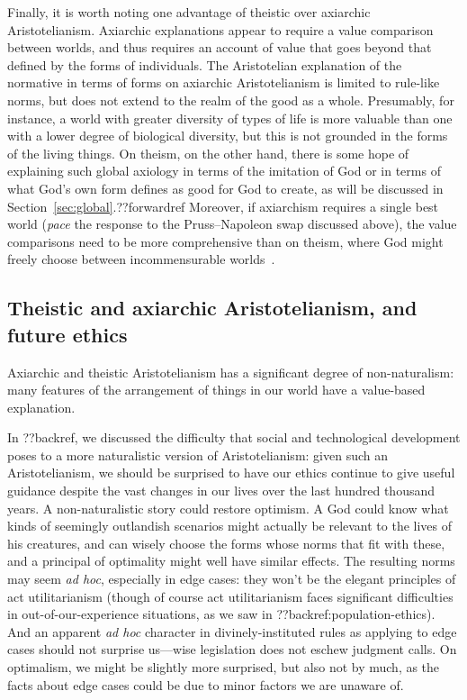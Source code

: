 Finally, it is worth noting one advantage of theistic over axiarchic Aristotelianism. Axiarchic explanations 
appear to require a value comparison between worlds, and thus requires an account of value that goes beyond 
that defined by the forms of individuals. The Aristotelian explanation of the normative in terms of forms on
axiarchic Aristotelianism is limited to rule-like norms, but does not extend to the realm of the good as a whole.
Presumably, for instance, a world with greater diversity of types of life is more valuable than one with a lower
degree of biological diversity, but this is not grounded in the forms of the living things. On theism, on the other 
hand, there is some hope of explaining such global axiology in terms of the imitation of God or in terms of what
God's own form defines as good for God to create, as will be discussed in Section~\ref{sec:global}.??forwardref Moreover, if
axiarchism requires a single best world (\textit{pace} the response to the Pruss--Napoleon swap discussed
above), the value comparisons need to be more comprehensive than on theism,
where God might freely choose between incommensurable worlds~\parencite{PrussCreation}.

\subsection{Theistic and axiarchic Aristotelianism, and future ethics}
Axiarchic and theistic Aristotelianism has a significant degree of non-naturalism: many features of the arrangement
of things in our world have a value-based explanation. 

In ??backref, we discussed the difficulty that social and technological development poses to a more naturalistic
version of Aristotelianism: given such an Aristotelianism, we should be surprised to have our ethics continue
to give useful guidance despite the vast changes in our lives over the last hundred thousand years. 
A non-naturalistic story could restore optimism. A God could 
know what kinds of seemingly outlandish scenarios might
actually be relevant to the lives of his creatures, and can wisely choose the forms whose norms that fit with these,
and a principal of optimality might well have similar effects. The resulting norms may 
seem \textit{ad hoc}, especially in edge cases: they won't be the elegant principles of act utilitarianism (though of course act utilitarianism
faces significant difficulties in out-of-our-experience situations, as we saw in ??backref:population-ethics). And an apparent
\textit{ad hoc} character in divinely-instituted rules as applying to edge cases should not surprise us---wise legislation does not eschew 
judgment calls. On optimalism, we might be slightly more surprised, but also not by much, as the facts about edge cases
could be due to minor factors we are unaware of.

